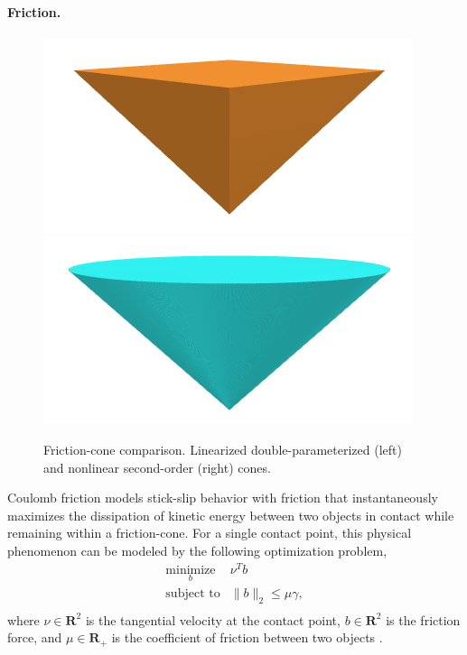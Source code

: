 \paragraph{Friction.} 
\begin{figure}[t]
	\centering
	\includegraphics[width=0.25\columnwidth]{dojo/linearized_cone.png}
	\includegraphics[width=0.25\columnwidth]{dojo/nonlinear_cone.png}
	\hfill
	\caption[Linearized and second-order friction-cone comparison]{Friction-cone comparison. Linearized double-parameterized (left) and nonlinear second-order (right) cones.}
	\label{intro_friction_cone_comparison}
\end{figure}
Coulomb friction \cite{moreau2011unilateral} models stick-slip behavior with friction that instantaneously maximizes the dissipation of kinetic energy between two objects in contact while remaining within a friction-cone. For a single contact point, this physical phenomenon can be modeled by the following optimization problem,
\begin{equation}
	\begin{array}{ll}
		\underset{b}{\mbox{minimize}} & \nu^T b\\
		\mbox{subject to} &\|b\|_2\leq \mu \gamma, \\
	\end{array} \label{intro_mdp}
\end{equation}
where $\nu \in \mathbf{R}^{2}$ is the tangential velocity at the contact point, $b \in \mathbf{R}^2$ is the friction force, and $\mu \in \mathbf{R}_{+}$ is the coefficient of friction between two objects \cite{moreau2011unilateral}. 

